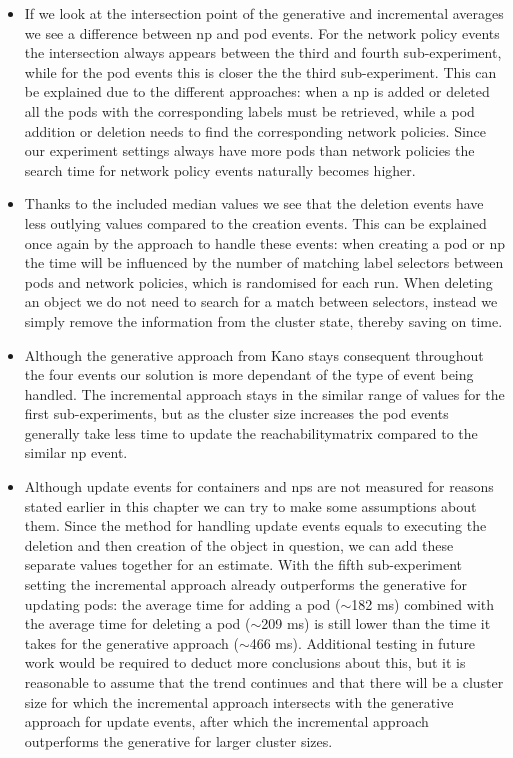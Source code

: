\begin{itemize}
    \item If we look at the intersection point of the generative and incremental averages we see a difference  between \acrshort{np} and pod events. For the network policy events the intersection always appears between the third and fourth sub-experiment, while for the pod events this is closer the the third sub-experiment. This can be explained due to the different approaches: when a \acrshort{np} is added or deleted all the pods with the corresponding labels must be retrieved, while a pod addition or deletion needs to find the corresponding network policies. Since our experiment settings always have more pods than network policies the search time for network policy events naturally becomes higher.
    
    \item Thanks to the included median values we see that the deletion events have less outlying values compared to the creation events. This can be explained once again by the approach to handle these events: when creating a pod or \acrshort{np} the time will be influenced by the number of matching label selectors between pods and network policies, which is randomised for each run. When deleting an object we do not need to search for a match between selectors, instead we simply remove the information from the cluster state, thereby saving on time.
    
    \item Although the generative approach from Kano stays consequent throughout the four events our solution is more dependant of the type of event being handled. The incremental approach stays in the similar range of values for the first sub-experiments, but as the cluster size increases the pod events generally take less time to update the reachabilitymatrix compared to the similar \acrshort{np} event. 
    
    \item Although update events for containers and \acrshort{np}s are not measured for reasons stated earlier in this chapter we can try to make some assumptions about them. Since the method for handling update events equals to executing the deletion and then creation of the object in question, we can add these separate values together for an estimate. With the fifth sub-experiment setting the incremental approach already outperforms the generative for updating pods: the average time for adding a pod ($\sim$182 ms) combined with the average time for deleting a pod ($\sim$209 ms) is still lower than the time it takes for the generative approach ($\sim$466 ms). Additional testing in future work would be required to deduct more conclusions about this, but it is reasonable to assume that the trend continues and that there will be a cluster size for which the incremental approach intersects with the generative approach for update events, after which the incremental approach outperforms the generative for larger cluster sizes.
\end{itemize}

